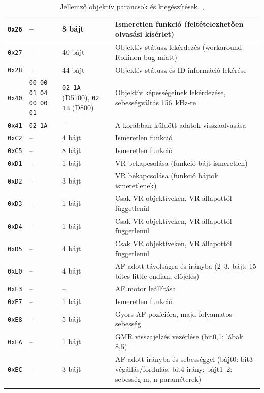 \begin{longtable}{|c|p{3.5cm}|p{3.5cm}|p{5cm}|}
    \texttt{0x26} & – & 8 bájt & Ismeretlen funkció (feltételezhetően olvasási kísérlet) \\
    \hline \texttt{0x27} & – & 40 bájt & Objektív státusz-lekérdezés (workaround Rokinon bug miatt) \\
    \hline\texttt{0x28} & – & 44 bájt & Objektív státusz és ID információ lekérése \\
    \hline \texttt{0x40} & \texttt{00 00 01 04 00 00 01} & \texttt{02 1A} (D5100), \newline \texttt{02 1B} (D800) & Objektív képességeinek lekérdezése, sebességváltás 156~kHz-re \\
    \hline \texttt{0x41} & \texttt{02 1A} & – & A korábban küldött adatok visszaolvasása \\
    \hline \texttt{0xC2} & – & 4 bájt & Ismeretlen funkció \\
    \hline \texttt{0xC5} & – & 8 bájt & Ismeretlen funkció \\
    \hline \texttt{0xD1} & – & 1 bájt & VR bekapcsolása (funkció bájt ismeretlen) \\
    \hline \texttt{0xD2} & – & 3 bájt & VR bekapcsolása (funkció bájtok ismeretlenek) \\
    \hline \texttt{0xD3} & – & 1 bájt & Csak VR objektíveken, VR állapottól függetlenül \\
    \hline \texttt{0xD4} & – & 1 bájt & Csak VR objektíveken, VR állapottól függetlenül \\
    \hline \texttt{0xD5} & – & 4 bájt & Csak VR objektíveken, VR állapottól függetlenül \\
    \hline \texttt{0xE0} & – & 4 bájt & AF adott távolságra és irányba \newline (2–3. bájt: 15 bites little-endian, előjeles) \\
    \hline \texttt{0xE3} & – & – & AF motor leállítása \\
    \hline \texttt{0xE7} & – & 1 bájt & Ismeretlen funkció \\
    \hline \texttt{0xE8} & – & 5 bájt & Gyors AF pozícióra, majd folyamatos sebesség \\
    \hline \texttt{0xEA} & – & 1 bájt & GMR visszajelzés vezérlése (bit0,1: lábak 8,5) \\
    \hline \texttt{0xEC} & – & 3 bájt & AF adott irányba és sebességgel \newline (bájt0: bit3 végállás/fordulás, bit4 irány; \newline bájt1–2: sebesség m, n paraméterek) \\
    \hline \caption{Jellemző objektív parancsok és kiegészítések. \cite{nikonhacker_fmount}, \cite{lainy_nikonlens_issue1}}
\end{longtable}


